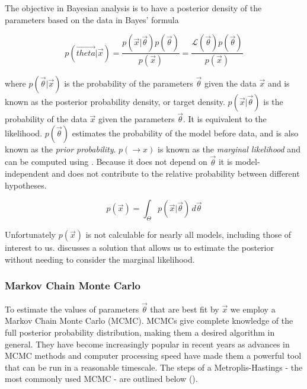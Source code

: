 The objective in Bayesian analysis is to have a posterior density of the parameters based on the data in Bayes' formula

\begin{equation}
p(\overrightarrow{theta}|\overrightarrow{x}) = \frac{p(\overrightarrow{x}|\overrightarrow{\theta})
p(\overrightarrow{\theta})}{p(\overrightarrow{x})} = \frac{\mathcal{L}(\overrightarrow{\theta})
p(\overrightarrow{\theta})}{p(\overrightarrow{x})}
\end{equation}

\noindent where $p(\overrightarrow{\theta}|\overrightarrow{x})$ is the probability of the parameters $\overrightarrow{\theta}$ given the
data $\overrightarrow{x}$ and is known as the posterior probability density, or target
density.  $p(\overrightarrow{x}|\overrightarrow{\theta})$ is the probability of the data $\overrightarrow{x}$ given the parameters
$\overrightarrow{\theta}$.  It is equivalent to the likelihood.  $p(\overrightarrow{\theta})$ estimates the probability of the
model before data, and is also known as the \textit{prior probability}.  $p(\rightarrow{x})$ is known as the \textit{marginal likelihood}
and can be computed using .  Because it does not depend on
$\overrightarrow{\theta}$ it is model-independent and does not contribute to the relative probability between different
hypotheses.

\begin{equation}
p(\overrightarrow{x}) = \int_{\Theta} p(\overrightarrow{x}|\overrightarrow{\theta})\, d\overrightarrow{\theta}
\label{eq:er_nr_calibrations_parameter_determ_mc_match_p_data}
\end{equation}

Unfortunately $p(\overrightarrow{x})$ is not calculable for nearly all models, including those of interest to
us.   discusses a solution that allows us to estimate the posterior without
needing to consider the marginal likelihood.



\subsubsection{Markov Chain Monte Carlo}
\label{subsubsec:er_nr_calibrations_parameter_determ_mcmc}
To estimate the values of parameters $\overrightarrow{\theta}$ that are best fit by $\overrightarrow{x}$ we employ a Markov Chain
Monte Carlo (MCMC).  MCMCs give complete knowledge of the full posterior probability distribution, making them a desired algorithm in
general.  They have become increasingly popular in recent years as advances in MCMC methods and computer processing speed have made them a
powerful tool that can be run in a reasonable timescale.  The steps of a Metroplis-Hastings - the most commonly used MCMC - are outlined
below ().

